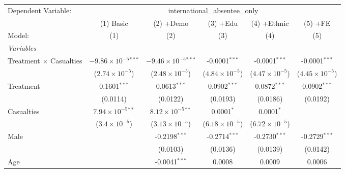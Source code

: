 
\begingroup
\centering
\begin{tabular}{lccccc}
   \tabularnewline \midrule \midrule
   Dependent Variable: & \multicolumn{5}{c}{international\_absentee\_only}\\
                                  & (1) Basic                      & (2) +Demo                      & (3) +Edu                       & (4) +Ethnic                    & (5) +FE \\   
   Model:                         & (1)                            & (2)                            & (3)                            & (4)                            & (5)\\  
   \midrule
   \emph{Variables}\\
   Treatment $\times$ Casualties  & $-9.86\times 10^{-5}$$^{***}$  & $-9.46\times 10^{-5}$$^{***}$  & -0.0001$^{***}$                & -0.0001$^{***}$                & -0.0001$^{***}$\\   
                                  & ($2.74\times 10^{-5}$)         & ($2.48\times 10^{-5}$)         & ($4.84\times 10^{-5}$)         & ($4.47\times 10^{-5}$)         & ($4.45\times 10^{-5}$)\\    
   Treatment                      & 0.1601$^{***}$                 & 0.0613$^{***}$                 & 0.0902$^{***}$                 & 0.0872$^{***}$                 & 0.0902$^{***}$\\   
                                  & (0.0114)                       & (0.0122)                       & (0.0193)                       & (0.0186)                       & (0.0192)\\   
   Casualties                     & $7.94\times 10^{-5}$$^{**}$    & $8.12\times 10^{-5}$$^{**}$    & 0.0001$^{*}$                   & 0.0001$^{*}$                   &   \\   
                                  & ($3.4\times 10^{-5}$)          & ($3.13\times 10^{-5}$)         & ($6.18\times 10^{-5}$)         & ($6.72\times 10^{-5}$)         &   \\   
   Male                           &                                & -0.2198$^{***}$                & -0.2714$^{***}$                & -0.2730$^{***}$                & -0.2729$^{***}$\\   
                                  &                                & (0.0103)                       & (0.0136)                       & (0.0139)                       & (0.0142)\\   
   Age                            &                                & -0.0041$^{***}$                & 0.0008                         & 0.0009                         & 0.0006\\   

\end{tabular}
